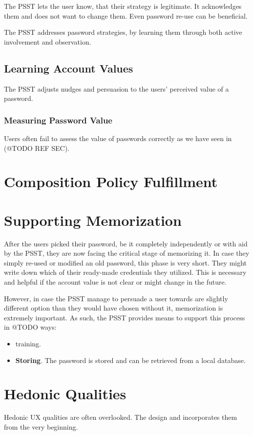 The PSST lets the user know, that their strategy is legitimate. It acknowledges them and does not want to change them.  Even password re-use can be beneficial.

The PSST addresses password strategies, by learning them through both active involvement and observation. 

\subsection{Learning Account Values}
The PSST adjusts nudges and persuasion to the users' perceived value of a password. 

\subsubsection{Measuring Password Value}
Users often fail to assess the value of passwords correctly as we have seen in (@TODO REF SEC). 

\section{Composition Policy Fulfillment}

\section{Supporting Memorization}
After the users picked their password, be it completely independently or with aid by the PSST, they are now facing the critical stage of memorizing it. In case they simply re-used or modified an old password, this phase is very short. They might write down which of their ready-made credentials they utilized. This is necessary and helpful if the account value is not clear or might change in the future. 

However, in case the PSST manage to persuade a user towards are slightly different option than they would have chosen without it, memorization is extremely important. As such, the PSST provides means to support this process in @TODO ways:
\begin{itemize}
\item training. 
\item \textbf{Storing}. The password is stored and can be retrieved from a local database. 
\end{itemize}

\section{Hedonic Qualities}
Hedonic UX qualities are often overlooked. The design and incorporates them from the very beginning. 



